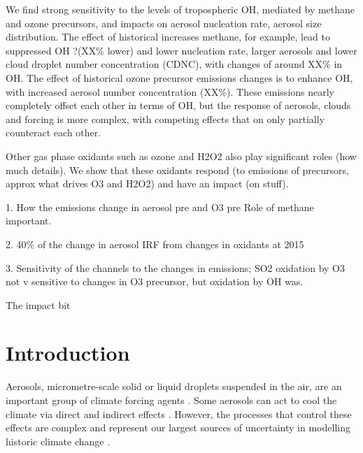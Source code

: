 We find strong sensitivity to the levels of tropospheric OH, mediated by methane and ozone precursors, and impacts on aerosol nucleation rate, aerosol size distribution. The effect of historical increases methane, for example, lead to suppressed OH ?(XX\% lower) 
and lower nucleation rate, larger aerosols and lower cloud droplet number concentration (CDNC), with changes of around XX\% in OH. 
The effect of historical ozone precursor emissions changes is to enhance OH, with increased aerosol number concentration (XX\%). These emissions nearly completely offset each other in terms of OH, but the response of aerosols, clouds and forcing is more complex, with competing effects that on only partially counteract each other.

Other gas phase oxidants such as ozone and H2O2 also play significant roles (how much details). We show that these oxidants respond (to emissions of precursors, approx what drives O3 and H2O2) and have an impact (on stuff).   


1. How the emissions change in aerosol pre and O3 pre 
Role of methane important.

2. 40\% of the change in aerosol IRF from changes in oxidants at 2015

3. Sensitivity of the channels to the changes in emissions; SO2 oxidation by O3 not v sensitive to changes in O3 precursor, but oxidation by OH was.   


The impact bit

\section{Introduction}
Aerosols, micrometre-scale solid or liquid droplets suspended in the air, are an important group of climate forcing agents \citep{forsterEarthEnergyBudget2021}. Some aerosols can act to cool the climate via direct and indirect effects \citep{angstromAtmosphericTransmissionSun1929, twomeyInfluencePollutionShortwave1977, charlsonPerturbationNorthernHemisphere1991,szopaShortlivedClimateForcers2021}. However, the processes that control these effects are complex and represent our largest sources of uncertainty in modelling historic climate change \citep{ghanChallengesConstrainingAnthropogenic2016, forsterEarthEnergyBudget2021}.

